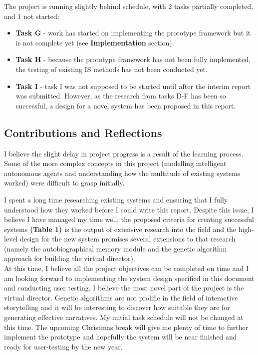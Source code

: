 \documentclass{sig-alternate-05-2015}
\begin{document}
The project is running slightly behind schedule, with 2 tasks partially completed, and 1 not started:
\begin{itemize}
	\item \textbf{Task G} - work has started on implementing the prototype framework but it is not complete yet (see \textbf{Implementation} section).
	\item \textbf{Task H} - because the prototype framework has not been fully implemented, the testing of existing IS methods has not been conducted yet.
	\item \textbf{Task I} - task I was not supposed to be started until after the interim report was submitted. However, as the research from tasks D-F has been so successful, a design for a novel system has been proposed in this report. 
\end{itemize}

\subsection{Contributions and Reflections}

\noindent I believe the slight delay in project progress is a result of the learning process. Some of the more complex concepts in this project (modelling intelligent autonomous agents and understanding how the multitude of existing systems worked) were difficult to grasp initially. 

I spent a long time researching existing systems and ensuring that I fully understood how they worked before I could write this report. Despite this issue, I believe I have managed my time well; the proposed criteria for creating successful systems \textbf{(Table 1)} is the output of extensive research into the field and the high-level design for the new system promises several extensions to that research (namely the autobiographical memory module and the genetic algorithm approach for building the virtual director).\\

At this time, I believe all the project objectives can be completed on time and I am looking forward to implementing the system design specified in this document and conducting user testing. I believe the most novel part of the project is the virtual director. Genetic algorithms are not prolific in the field of interactive storytelling and it will be interesting to discover how suitable they are for generating effective narratives. My initial task schedule will not be changed at this time. The upcoming Christmas break will give me plenty of time to further implement the prototype and hopefully the system will be near finished and ready for user-testing by the new year.
\end{document}

